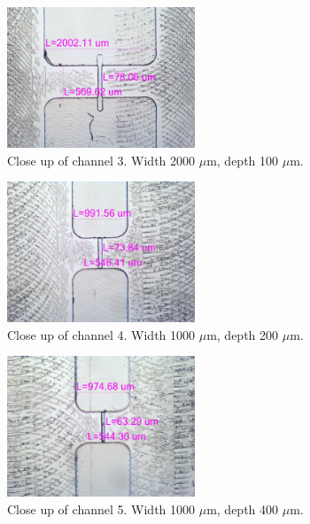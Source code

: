 \documentclass[journal, a4paper]{IEEEtran}
\begin{document}
\begin{figure}
\begin{center}
\includegraphics[width=0.5\textwidth]{images/w2000d100Dim.jpg}
		\caption{\label{fig:3channel} Close up of channel 3. Width 2000 $\mu$m, depth 100 $\mu$m.}
        \end{center}
\end{figure}

\begin{figure}
\begin{center}
\includegraphics[width=0.5\textwidth]{images/w1000d200Dim.jpg}
		\caption{\label{fig:4channel} Close up of channel 4. Width 1000 $\mu$m, depth 200 $\mu$m.}
        \end{center}
\end{figure}
    
\begin{figure}
\begin{center}
\includegraphics[width=0.5\textwidth]{images/w1000d400Dim.jpg}
		\caption{\label{fig:5channel} Close up of channel 5. Width 1000 $\mu$m, depth 400 $\mu$m.}
        \end{center}
	\end{figure}
\end{document}
